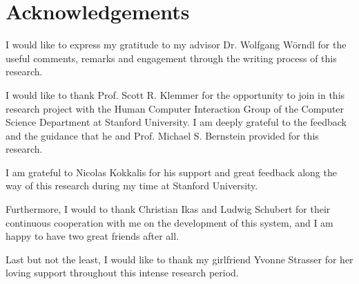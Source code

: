 \clearemptydoublepage
{}
{}	

\chapter*{Acknowledgements}

I would like to express my gratitude to my advisor Dr. Wolfgang W{\"o}rndl for the useful comments, remarks and engagement through the writing process of this research.
\vspace{1cm}

I would like to thank Prof. Scott R. Klemmer for the opportunity to join in this research project with the Human Computer Interaction Group of the Computer Science Department at Stanford University. I am deeply grateful to the feedback and the guidance that he and Prof. Michael S. Bernstein provided for this research.
\vspace{1cm}

I am grateful to Nicolas Kokkalis for his support and great feedback along the way of this research during my time at Stanford University.
\vspace{1cm}

Furthermore, I would to thank Christian Ikas and Ludwig Schubert for their continuous cooperation with me on the development of this system, and I am happy to have two great friends after all.
\vspace{1cm}

Last but not the least, I would like to thank my girlfriend Yvonne Strasser for her loving support throughout this intense research period.
